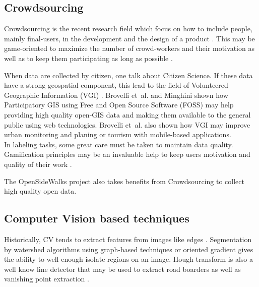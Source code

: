 \documentclass[10pt,conference,a4paper]{IEEEtran}
\begin{document}
\subsection{Crowdsourcing}
Crowdsourcing is the recent research field which focus on how to include people, mainly final-users, in the development and the design of a product \cite{ghezzi_crowdsourcing:_2017}. This may be game-oriented to maximize the number of crowd-workers and their motivation as well as to keep them participating as long as possible \cite{zeng_motivation_2017,morschheuser_gamified_2017}.

When data are collected by citizen, one talk about Citizen Science. If these data have a strong geospatial component, this lead to the field of Volunteered Geographic Information (VGI) \cite{sui_citizen_2013}. Brovelli et~al. \cite{brovelli_webbased_2014} and Minghini \cite{minghini_multi-dimensional_2014} shown how Participatory GIS using Free and Open Source Software (FOSS) may help providing high quality open-GIS data and making them available to the general public using web technologies. Brovelli et~al. \cite{brovelli_public_2016} also shown how VGI may improve urban monitoring and planing or tourism with mobile-based applications.\\


In labeling tasks, some great care must be taken to maintain data quality. Gamification principles may be an invaluable help to keep users motivation and quality of their work \cite{von_ahn_labeling_2004,von2006peekaboom}. 

The OpenSideWalks project also takes benefits from Crowdsourcing \cite{noauthor_opensidewalks_nodate,tanweer_mapping_2017} to collect high quality open data. %



\subsection{Computer Vision based techniques}
Historically, CV tends to extract features from images like edges \cite{canny_computational_1986}.
Segmentation by watershed algorithms \cite{meyer_morphological_1990, beucher_segmentation:_1993} using graph-based techniques \cite{felzenszwalb_efficient_2004} or oriented gradient \cite{malisiewicz_ensemble_2011} gives the ability to well enough isolate regions on an image.
Hough transform is also a well know line detector that may be used to extract road boarders \cite{duda_use_1972,illingworth_survey_1988,ballard_generalizing_1981,kiryati_probabilistic_1991} as well as vanishing point extraction \cite{se_road_2003,wang2004lane,kong2009vanishing}.
\end{document}
